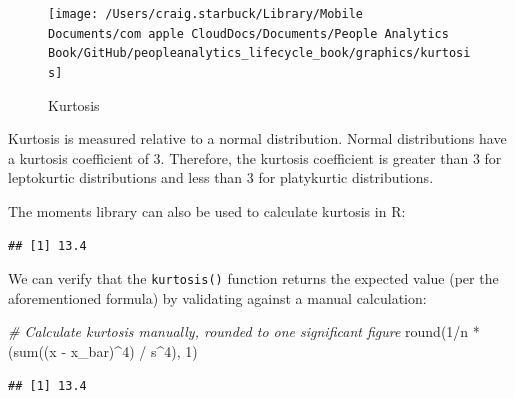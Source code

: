 \documentclass[
]{book}
\newenvironment{Shaded}{\begin{snugshade}}{\end{snugshade}}
\newcommand{\CommentTok}[1]{\textcolor[rgb]{0.56,0.35,0.01}{\textit{#1}}}
\newcommand{\DecValTok}[1]{\textcolor[rgb]{0.00,0.00,0.81}{#1}}
\newcommand{\FunctionTok}[1]{\textcolor[rgb]{0.00,0.00,0.00}{#1}}
\newcommand{\NormalTok}[1]{#1}
\newcommand{\SpecialCharTok}[1]{\textcolor[rgb]{0.00,0.00,0.00}{#1}}
\begin{document}
\begin{figure}

{\centering \texttt{[image: /Users/craig.starbuck/Library/Mobile Documents/com~apple~CloudDocs/Documents/People Analytics Book/GitHub/peopleanalytics\_lifecycle\_book/graphics/kurtosis]} 

}

\caption{Kurtosis}\label{fig:kurtosis}
\end{figure}

Kurtosis is measured relative to a normal distribution. Normal distributions have a kurtosis coefficient of 3. Therefore, the kurtosis coefficient is greater than 3 for leptokurtic distributions and less than 3 for platykurtic distributions.

The moments library can also be used to calculate kurtosis in R:

\begin{Shaded}
\end{Shaded}

\begin{verbatim}
## [1] 13.4
\end{verbatim}

We can verify that the \texttt{kurtosis()} function returns the expected value (per the aforementioned formula) by validating against a manual calculation:

\begin{Shaded}
\begin{Highlighting}[]
\CommentTok{\# Calculate kurtosis manually, rounded to one significant figure}
\FunctionTok{round}\NormalTok{(}\DecValTok{1}\SpecialCharTok{/}\NormalTok{n }\SpecialCharTok{*}\NormalTok{ (}\FunctionTok{sum}\NormalTok{((x }\SpecialCharTok{{-}}\NormalTok{ x\_bar)}\SpecialCharTok{\^{}}\DecValTok{4}\NormalTok{) }\SpecialCharTok{/}\NormalTok{ s}\SpecialCharTok{\^{}}\DecValTok{4}\NormalTok{), }\DecValTok{1}\NormalTok{)}
\end{Highlighting}
\end{Shaded}

\begin{verbatim}
## [1] 13.4
\end{verbatim}
\end{document}
